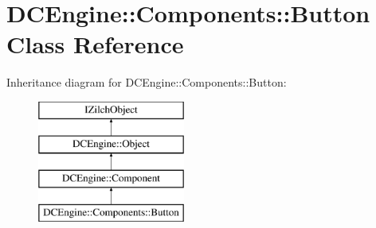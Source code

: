 \hypertarget{classDCEngine_1_1Components_1_1Button}{\section{D\-C\-Engine\-:\-:Components\-:\-:Button Class Reference}
\label{classDCEngine_1_1Components_1_1Button}
}
Inheritance diagram for D\-C\-Engine\-:\-:Components\-:\-:Button\-:\begin{figure}[H]
\begin{center}
\leavevmode
\includegraphics[height=4.000000cm]{classDCEngine_1_1Components_1_1Button}
\end{center}
\end{figure}
